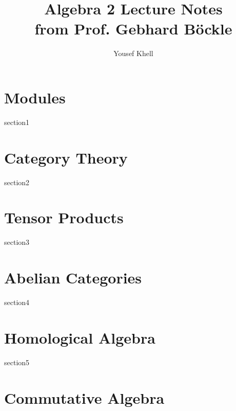 \documentclass[a4paper]{report}
\title{\vspace{-2cm} Algebra 2 Lecture Notes\\from Prof. Gebhard Böckle}
\author{Yousef Khell}
\begin{document}
\maketitle
\tableofcontents

\chapter{Modules}
{section1}
\chapter{Category Theory}
{section2}
\chapter{Tensor Products}
{section3}
\chapter{Abelian Categories}
{section4}
\chapter{Homological Algebra}
{section5}
\chapter{Commutative Algebra}
\end{document}
